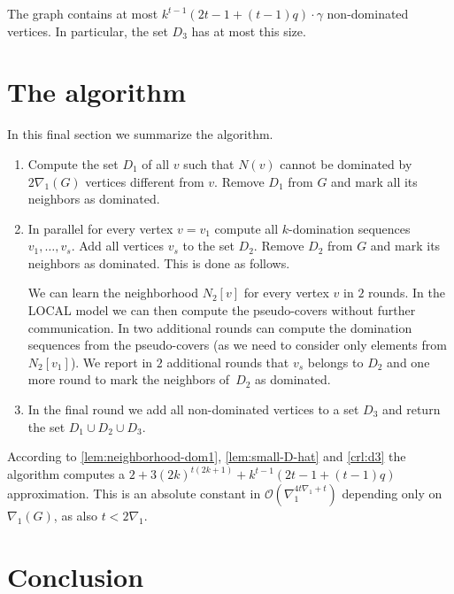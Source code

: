 \begin{corollary}\label{crl:d3}
The graph contains at most $k^{t-1}(2t-1+(t-1)q)\cdot \gamma$ non-dominated
vertices. In particular, the set $D_3$ has at most this size.
\end{corollary}



%
\section{The algorithm}

In this final section we summarize the algorithm.

\begin{enumerate}
\item Compute the set $D_1$ of all $v$ such that $N(v)$ cannot be
dominated by $2\nabla_1(G)$ vertices different from $v$.
Remove $D_1$ from $G$ and mark all its neighbors as dominated.
\item In parallel for every vertex $v=v_1$ compute all $k$-domination
sequences $v_1,\ldots, v_s$. Add all vertices $v_s$ to the set
$D_2$. Remove $D_2$ from $G$ and mark its neighbors as
dominated. This is done as follows.

We can learn the
neighborhood $N_2[v]$ for every vertex $v$ in $2$ rounds.
In the LOCAL model we can then compute the pseudo-covers
without further communication. In two additional rounds can
compute the domination sequences from the pseudo-covers
(as we need to consider only elements from $N_2[v_1]$).
We report in $2$ additional rounds that $v_s$ belongs to $D_2$
and one more round to mark the neighbors of~$D_2$ as
dominated.
\item In the final round we add all non-dominated vertices to a set $D_3$
and return the set $D_1\cup D_2\cup D_3$.
\end{enumerate}

According to \cref{lem:neighborhood-dom1},
\cref{lem:small-D-hat}
  and \cref{crl:d3}
  the algorithm computes a $2+  3(2k)^{t(2k+1)}+k^{t-1}(2t-1+(t-1)q)$
  approximation. This is an absolute constant in
  $\mathcal{O}(\nabla_1^{4t\nabla_1+t})$ depending only on $\nabla_1(G)$,
  as also $t<2\nabla_1$.










%
\section{Conclusion}


